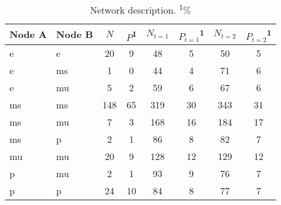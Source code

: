\begin{table}[]
	\centering
	\begin{tabularx}{\linewidth}{llcccccc}
		Node A & Node B & $N$ & $P$\textsuperscript{1} & $N_{t=1}$ & $P_{t=1}$\textsuperscript{1} & $N_{t=2}$ & $P_{t=2}$\textsuperscript{1} \\ 
		\hline
		e & e & 20 & 9 & 48 & 5 & 50 & 5 \\ 
		e & ms & 1 & 0 & 44 & 4 & 71 & 6 \\ 
		e & mu & 5 & 2 & 59 & 6 & 67 & 6 \\ 
		ms & ms & 148 & 65 & 319 & 30 & 343 & 31 \\ 
		ms & mu & 7 & 3 & 168 & 16 & 184 & 17 \\ 
		ms & p & 2 & 1 & 86 & 8 & 82 & 7 \\ 
		mu & mu & 20 & 9 & 128 & 12 & 129 & 12 \\ 
		p & mu & 2 & 1 & 93 & 9 & 76 & 7 \\ 
		p & p & 24 & 10 & 84 & 8 & 77 & 7 \\ 
	\end{tabularx}
	\caption{Network description. \textsuperscript{1}$\%$}
	\label{table:edges}
\end{table}

